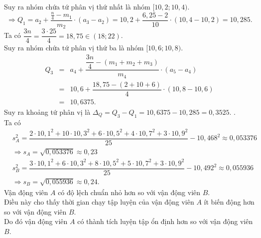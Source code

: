 \begin{ex}
{\begin{itemchoice}
Suy ra nhóm chứa tứ phân vị thứ nhất là nhóm $[10{,}2;10{,}4)$.
$$
\Rightarrow Q_1=a_2+\dfrac{\tfrac{n}{4}-m_1}{m_2} \cdot(a_3-a_2)=10{,}2+\dfrac{6{,}25-2}{10} \cdot(10{,}4-10{,}2)=10{,}285.$$
Ta có $\dfrac{3n}{4}=\dfrac{3\cdot 25}{4}=18{,}75 \in(18;22)$.\\ 
Suy ra nhóm chứa tứ phân vị thứ ba là nhóm $[10{,}6;10{,}8)$.\\
\begin{eqnarray*}
Q_3&=&a_4+\dfrac{\dfrac{3n}{4}-(m_1+m_2+m_3)}{m_4} \cdot (a_5-a_4)\\
&=&10{,}6+\dfrac{18{,}75-(2+10+6)}{4} \cdot(10{,}8-10{,}6)\\
&=&10{,}6375.	
\end{eqnarray*}
Suy ra khoảng tứ phân vị là $\Delta_Q=Q_3-Q_1=10{,}6375-10{,}285=0{,}3525$.
	.\\
Ta có
\begin{eqnarray*}
	&s_A^2=\dfrac{2\cdot 10{,}1^2+10\cdot 10{,}3^2+6\cdot10{,}5^2+4\cdot 10{,}7^2+3\cdot 10{,}9^2}{25}-10{,}468^2 \approx 0{,}053376 \\&\Rightarrow s_A=\sqrt{0{,}053376} \approx 0{,}23 \\
	& s_B^2=\dfrac{3\cdot 10{,}1^2+6\cdot10{,}3^2+8\cdot 10{,}5^2+5\cdot 10{,}7^2+3\cdot 10{,}9^2}{25}-10{,}492^2 \approx 0{,}055936\\& \Rightarrow s_B=\sqrt{0{,}055936} \approx 0{,}24.
\end{eqnarray*}
Vận động viên $A$ có độ lệch chuẩn nhỏ hơn so với vận động viên $B$.\\ 
Điều này cho thấy thời gian chạy tập luyện của vận động viên $A$ ít biến động hơn so với vận động viên $B$.\\ 
Do đó vận động viên $A$ có thành tích luyện tập ổn định hơn so với vận động viên $B$.
\end{itemchoice}
}
\end{ex}

